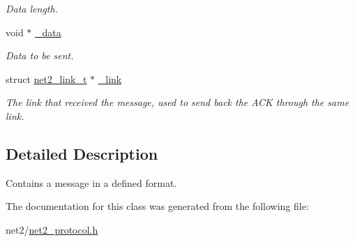 \begin{DoxyCompactItemize}
\begin{DoxyCompactList}\small\item\em Data length. \end{DoxyCompactList}\item 
\hypertarget{structnet2__message__t_a157cea10e17c189684e71e2f4c30b217}{void $\ast$ \hyperlink{structnet2__message__t_a157cea10e17c189684e71e2f4c30b217}{\-\_\-data}}\label{structnet2__message__t_a157cea10e17c189684e71e2f4c30b217}

\begin{DoxyCompactList}\small\item\em Data to be sent. \end{DoxyCompactList}\item 
\hypertarget{structnet2__message__t_ad3c6032953e3934d4e833daae04051ae}{struct \hyperlink{structnet2__link__t}{net2\-\_\-link\-\_\-t} $\ast$ \hyperlink{structnet2__message__t_ad3c6032953e3934d4e833daae04051ae}{\-\_\-link}}\label{structnet2__message__t_ad3c6032953e3934d4e833daae04051ae}

\begin{DoxyCompactList}\small\item\em The link that received the message, used to send back the A\-C\-K through the same link. \end{DoxyCompactList}\end{DoxyCompactItemize}


\subsection{Detailed Description}
Contains a message in a defined format. 

The documentation for this class was generated from the following file\-:\begin{DoxyCompactItemize}
\item 
net2/\hyperlink{net2__protocol_8h}{net2\-\_\-protocol.\-h}\end{DoxyCompactItemize}
